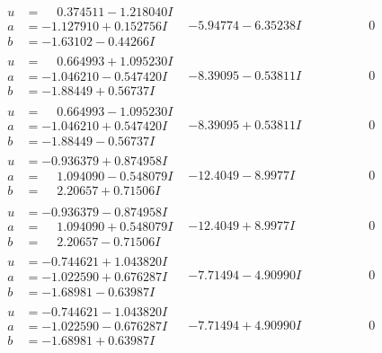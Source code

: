 \documentclass[1p]{elsarticle_modified}
\theoremstyle{definition}
\begin{document}
$$\begin{array}{c|c|c}
\begin{aligned}
u &= \phantom{-}0.374511 - 1.218040 I \\
a &= -1.127910 + 0.152756 I \\
b &= -1.63102 - 0.44266 I\end{aligned}
 & -5.94774 - 6.35238 I & \phantom{-0.000000 } 0 \\ \hline\begin{aligned}
u &= \phantom{-}0.664993 + 1.095230 I \\
a &= -1.046210 - 0.547420 I \\
b &= -1.88449 + 0.56737 I\end{aligned}
 & -8.39095 - 0.53811 I & \phantom{-0.000000 } 0 \\ \hline\begin{aligned}
u &= \phantom{-}0.664993 - 1.095230 I \\
a &= -1.046210 + 0.547420 I \\
b &= -1.88449 - 0.56737 I\end{aligned}
 & -8.39095 + 0.53811 I & \phantom{-0.000000 } 0 \\ \hline\begin{aligned}
u &= -0.936379 + 0.874958 I \\
a &= \phantom{-}1.094090 - 0.548079 I \\
b &= \phantom{-}2.20657 + 0.71506 I\end{aligned}
 & -12.4049 - 8.9977 I & \phantom{-0.000000 } 0 \\ \hline\begin{aligned}
u &= -0.936379 - 0.874958 I \\
a &= \phantom{-}1.094090 + 0.548079 I \\
b &= \phantom{-}2.20657 - 0.71506 I\end{aligned}
 & -12.4049 + 8.9977 I & \phantom{-0.000000 } 0 \\ \hline\begin{aligned}
u &= -0.744621 + 1.043820 I \\
a &= -1.022590 + 0.676287 I \\
b &= -1.68981 - 0.63987 I\end{aligned}
 & -7.71494 - 4.90990 I & \phantom{-0.000000 } 0 \\ \hline\begin{aligned}
u &= -0.744621 - 1.043820 I \\
a &= -1.022590 - 0.676287 I \\
b &= -1.68981 + 0.63987 I\end{aligned}
 & -7.71494 + 4.90990 I & \phantom{-0.000000 } 0 \\ \hline\begin{aligned}

\end{aligned}
\end{array}$$
\end{document}
